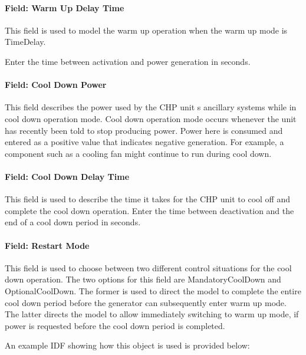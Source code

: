 \paragraph{Field: Warm Up Delay Time}\label{field-warm-up-delay-time}

This field is used to model the warm up operation when the warm up mode is TimeDelay.

Enter the time between activation and power generation in seconds.

\paragraph{Field: Cool Down Power}\label{field-cool-down-power}

This field describes the power used by the CHP unit s ancillary systems while in cool down operation mode. Cool down operation mode occurs whenever the unit has recently been told to stop producing power. Power here is consumed and entered as a positive value that indicates negative generation. For example, a component such as a cooling fan might continue to run during cool down.

\paragraph{Field: Cool Down Delay Time}\label{field-cool-down-delay-time}

This field is used to describe the time it takes for the CHP unit to cool off and complete the cool down operation. Enter the time between deactivation and the end of a cool down period in seconds.

\paragraph{Field: Restart Mode}\label{field-restart-mode}

This field is used to choose between two different control situations for the cool down operation. The two options for this field are MandatoryCoolDown and OptionalCoolDown. The former is used to direct the model to complete the entire cool down period before the generator can subsequently enter warm up mode. The latter directs the model to allow immediately switching to warm up mode, if power is requested before the cool down period is completed.

An example IDF showing how this object is used is provided below:

